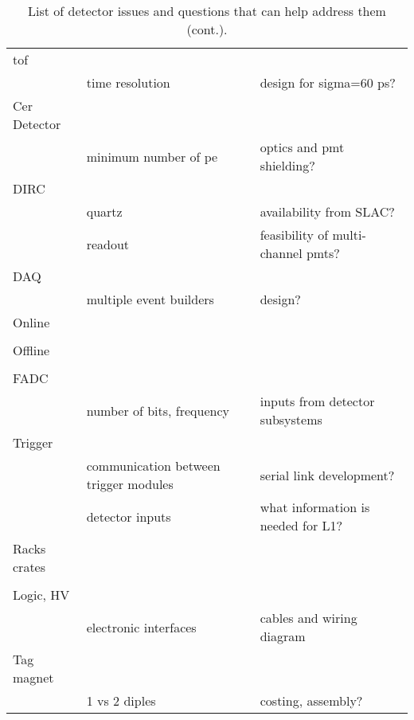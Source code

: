 \documentclass[12pt,dvips]{article}
\begin{document}
\begin{table}[htb] 
\caption{List of detector issues and questions that can help address them (cont.). }
\begin{center}
\begin{tabular}{|l|l|l|}\hline \hline

tof         &         &                           \\
            & time resolution & design for sigma=60 ps?  \\ \hline
Cer Detector &         &                           \\
            & minimum number of pe & optics and pmt shielding? \\ \hline
DIRC        &         &                           \\
            & quartz  & availability from SLAC? \\
            & readout & feasibility of multi-channel pmts? \\ \hline
DAQ         &         &                           \\
            & multiple event builders & design? \\ \hline
Online      &         &                           \\
            &  &  \\ \hline
Offline     &         &                           \\
            &  &  \\ \hline
FADC        &         &                           \\
            & number of bits, frequency  & inputs from detector subsystems \\ \hline
Trigger     &         &                           \\
            & communication between trigger modules & serial link development? \\
            & detector inputs & what information is needed for L1?  \\ \hline
Racks crates &         &                           \\
            &  &  \\ \hline
Logic, HV    &         &                           \\
            & electronic interfaces & cables and wiring diagram    \\ \hline
Tag magnet  &         &                           \\
            & 1 vs 2 diples & costing, assembly?  \\ \hline

\end{tabular}
\end{center}
\end{table}
\end{document}
